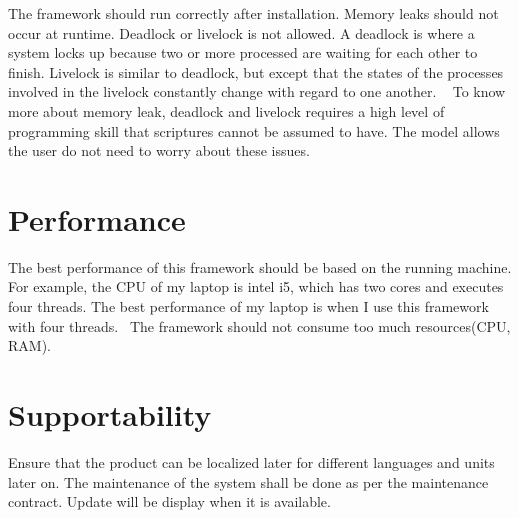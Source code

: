 The framework should run correctly after installation. Memory leaks should not occur at runtime. Deadlock or livelock is not allowed. A deadlock is where a system locks up because two or more processed are waiting for each other to finish. Livelock is similar to deadlock, but except that the states of the processes involved in the livelock constantly change with regard to one another. ~\newline
To know more about memory leak, deadlock and livelock requires a high level of programming skill that scriptures cannot be assumed to have. The model allows the user do not need to worry about these issues.\hypertarget{_f_u_r_p_s_FURPSPerformance}{}\section{Performance}\label{_f_u_r_p_s_FURPSPerformance}
The best performance of this framework should be based on the running machine. For example, the C\+P\+U of my laptop is intel i5, which has two cores and executes four threads. The best performance of my laptop is when I use this framework with four threads.~\newline
The framework should not consume too much resources(\+C\+P\+U, R\+A\+M).\hypertarget{_f_u_r_p_s_FURPSSupportability}{}\section{Supportability}\label{_f_u_r_p_s_FURPSSupportability}
Ensure that the product can be localized later for different languages and units later on. The maintenance of the system shall be done as per the maintenance contract. Update will be display when it is available. 